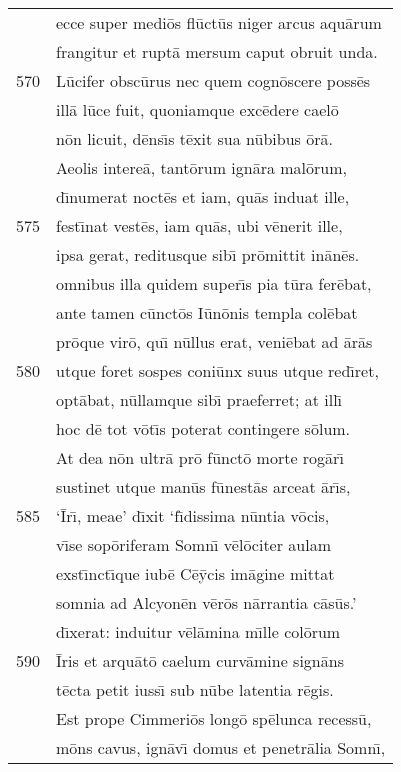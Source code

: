 \documentclass[paper=6in:9in,pagesize=pdftex,
               headinclude=on,footinclude=on,12pt]{scrbook}
\begin{document}
\begin{longtable}[p]{ r l }
 & ecce super medi\=os fl\=uct\=us niger arcus aqu\=arum\\ 
 & frangitur et rupt\=a mersum caput obruit unda.\\ 
570 & L\=ucifer obsc\=urus nec quem cogn\=oscere poss\=es\\ 
 & ill\=a l\=uce fuit, quoniamque exc\=edere cael\=o\\ 
 & n\=on licuit, d\=ens\={\i}s t\=exit sua n\=ubibus \=or\=a.\\ 
 & \indent Aeolis intere\=a, tant\=orum ign\=ara mal\=orum,\\ 
 & d\={\i}numerat noct\=es et iam, qu\=as induat ille,\\ 
575 & fest\={\i}nat vest\=es, iam qu\=as, ubi v\=enerit ille,\\ 
 & ipsa gerat, reditusque sib\={\i} pr\=omittit in\=an\=es.\\ 
 & omnibus illa quidem super\={\i}s pia t\=ura fer\=ebat,\\ 
 & ante tamen c\=unct\=os I\=un\=onis templa col\=ebat\\ 
 & pr\=oque vir\=o, qu\={\i} n\=ullus erat, veni\=ebat ad \=ar\=as\\ 
580 & utque foret sospes coni\=unx suus utque red\={\i}ret,\\ 
 & opt\=abat, n\=ullamque sib\={\i} praeferret; at ill\={\i}\\ 
 & hoc d\=e tot v\=ot\={\i}s poterat contingere s\=olum.\\ 
 & \indent At dea n\=on ultr\=a pr\=o f\=unct\=o morte rog\=ar\={\i}\\ 
 & sustinet utque man\=us f\=unest\=as arceat \=ar\={\i}s,\\ 
585 & `\=Ir\={\i}, meae' d\={\i}xit `f\={\i}dissima n\=untia v\=ocis,\\ 
 & v\={\i}se sop\=oriferam Somn\={\i} v\=el\=ociter aulam\\ 
 & exst\={\i}nct\={\i}que iub\=e C\=e\=ycis im\=agine mittat\\ 
 & somnia ad Alcyon\=en v\=er\=os n\=arrantia c\=as\=us.'\\ 
 & d\={\i}xerat: induitur v\=el\=amina m\={\i}lle col\=orum\\ 
590 & \=Iris et arqu\=at\=o caelum curv\=amine sign\=ans\\ 
 & t\=ecta petit iuss\={\i} sub n\=ube latentia r\=egis.\\ 
 & \indent Est prope Cimmeri\=os long\=o sp\=elunca recess\=u,\\ 
 & m\=ons cavus, ign\=av\={\i} domus et penetr\=alia Somn\={\i},\\ 

\end{longtable}
\end{document}
